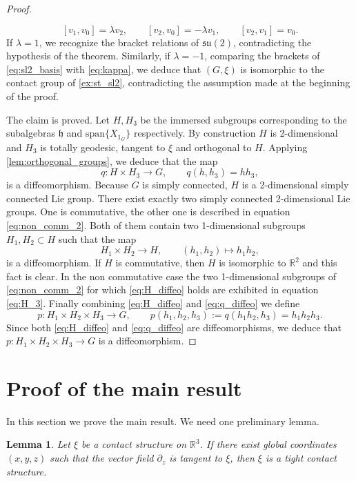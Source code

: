 \documentclass[reqno]{amsart}
\newtheorem{lemma}[theorem]{Lemma}
\theoremstyle{remark}
\theoremstyle{plain}
\begin{document}
\begin{proof}
\begin{enumerate}
    \begin{equation}\label{eq:kappa}
        [v_1,v_0]=\lambda v_2,\qquad 
[v_2,v_0]=-\lambda v_1,\qquad
[v_2,v_1]=v_0.
    \end{equation}
    If $\lambda=1$, we recognize the bracket relations of $\mathfrak {su}(2)$, contradicting the hypothesis of the theorem. Similarly, if $\lambda=-1$, comparing the brackets of \eqref{eq:sl2_basis} with \eqref{eq:kappa}, we deduce that $(G,\xi)$ is isomorphic to the contact group of \cref{ex:st_sl2}, contradicting the assumption made at the beginning of the proof.
 \end{enumerate}   
 The claim is proved. Let $H,H_3$ be the immersed subgroups corresponding to the subalgebras $\mathfrak h$ and $\mathrm{span}\{X_{1_G}\}$ respectively. By construction $H$ is 2-dimensional and $H_3$ is totally geodesic, tangent to $\xi$ and orthogonal to $H$. Applying \cref{lem:orthogonal_groups}, we deduce that the map 
\begin{equation}\label{eq:q_diffeo}
   q:H\times H_3\to G,\qquad q(h,h_3)=hh_3,
\end{equation}
is a diffeomorphism. Because $G$ is simply connected, $H$ is a 2-dimensional simply connected Lie group. There exist exactly two simply connected 2-dimensional Lie groups. One is commutative, the other one is described in equation \eqref{eq:non_comm_2}. Both of them contain two 1-dimensional subgroups $H_1,H_2\subset H$ such that the map 
\begin{equation}\label{eq:H_diffeo}
    H_1\times H_2\to H,\qquad (h_1,h_2)\mapsto h_1 h_2,
\end{equation}
is a diffeomorphism. If $H$ is commutative, then $H$ is isomorphic to $\mathbb R^2$ and this fact is clear. In the non commutative case the two 1-dimensional subgroups of \eqref{eq:non_comm_2} for which \eqref{eq:H_diffeo} holds are exhibited in equation \eqref{eq:H_3}. Finally combining \eqref{eq:H_diffeo} and \eqref{eq:q_diffeo} we define
\begin{equation}
    p:H_1\times H_2\times H_3\to G,\qquad p(h_1,h_2,h_3):=q(h_1h_2,h_3)=h_1 h_2h_3.
\end{equation}
Since both \eqref{eq:H_diffeo} and \eqref{eq:q_diffeo} are diffeomorphisms, we deduce that $p:H_1\times H_2\times H_3\to G$ is a diffeomorphism. 
    \end{proof}
\section{Proof of the main result}\label{sec:proof_of_main}
In this section we prove the main result. We need one preliminary lemma. 
\begin{lemma}\label{lem:rectifiable_tight}
	Let \(\xi\) be a contact structure on \(\mathbb{R}^3\). If there exist global coordinates \((x,y,z)\) such that the vector field \(\partial_z\) is tangent to $\xi$, then \(\xi\) is a tight contact structure.
\end{lemma}
\end{document}
